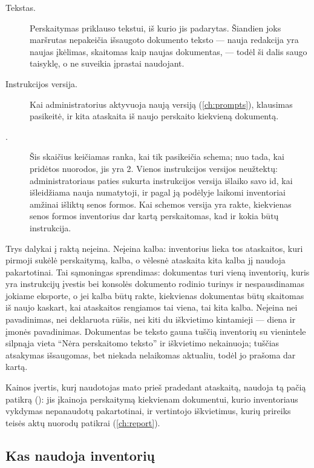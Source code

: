 \begin{description}
  \item[Tekstas.] Perskaitymas priklauso tekstui, iš kurio jis padarytas. Šiandien joks
    maršrutas nepakeičia išsaugoto dokumento teksto --- nauja redakcija yra naujas įkėlimas,
    skaitomas kaip naujas dokumentas, --- todėl ši dalis saugo taisyklę, o ne suveikia įprastai
    naudojant.
  \item[Instrukcijos versija.] Kai administratorius aktyvuoja naują 
    versiją (\cref{ch:prompts}), klausimas pasikeitė, ir kita ataskaita iš naujo perskaito
    kiekvieną dokumentą.
  \item[.] Šis skaičius keičiamas ranka, kai tik pasikeičia schema; nuo
    tada, kai pridėtos nuorodos, jis yra 2. Vienos instrukcijos versijos neužtektų:
    administratoriaus paties sukurta instrukcijos versija išlaiko savo id, kai išleidžiama nauja
    numatytoji, ir pagal ją podėlyje laikomi inventoriai amžinai išliktų senos formos. Kai
    schemos versija yra rakte, kiekvienas senos formos inventorius dar kartą perskaitomas, kad
    ir kokia būtų instrukcija.
\end{description}

Trys dalykai į raktą neįeina. Neįeina kalba: inventorius lieka tos ataskaitos, kuri pirmoji
sukėlė perskaitymą, kalba, o vėlesnė ataskaita kita kalba jį naudoja pakartotinai. Tai
sąmoningas sprendimas: dokumentas turi vieną inventorių, kuris yra instrukcijų įvestis bei
konsolės dokumento rodinio turinys ir nespausdinamas jokiame eksporte, o jei kalba būtų rakte,
kiekvienas dokumentas būtų skaitomas iš naujo kaskart, kai ataskaitos rengiamos tai viena, tai
kita kalba. Neįeina nei
pavadinimas, nei deklaruota rūšis, nei kiti du iškvietimo kintamieji --- diena ir įmonės
pavadinimas. Dokumentas be teksto gauna tuščią inventorių su vienintele
silpnąja vieta \enquote{Nėra perskaitomo teksto} ir iškvietimo nekainuoja; tuščias atsakymas
išsaugomas, bet niekada nelaikomas aktualiu, todėl jo prašoma dar kartą.

Kainos įvertis, kurį naudotojas mato prieš pradedant ataskaitą, naudoja tą pačią patikrą
(): jis įkainoja perskaitymą kiekvienam dokumentui, kurio
inventoriaus vykdymas nepanaudotų pakartotinai, ir vertintojo iškvietimus, kurių prireiks
teisės aktų nuorodų patikrai (\cref{ch:report}).

\subsection{Kas naudoja inventorių}\label{sec:company:inventory-uses}

